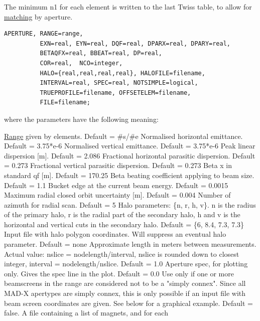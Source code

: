 The minimum n1 for each element is written to the last Twiss table, to
allow for \href{../match/match.html}{matching} by aperture.   
	
\begin{verbatim}
APERTURE, RANGE=range,
          EXN=real, EYN=real, DQF=real, DPARX=real, DPARY=real, 
          BETAQFX=real, BBEAT=real, DP=real, 
          COR=real,  NCO=integer, 
          HALO={real,real,real,real}, HALOFILE=filename,
          INTERVAL=real, SPEC=real, NOTSIMPLE=logical, 
          TRUEPROFILE=filename, OFFSETELEM=filename, 
          FILE=filename;  
\end{verbatim} 
where the parameters have the following meaning: 
\begin{madlist}
    \href{../Introduction/ranges.html}{Range} given by
     elements. Default = \#s/\#e  
    Normalised horizontal emittance. Default = 3.75*e-6  
    Normalised vertical emittance. Default = 3.75*e-6 
    Peak linear dispersion [m]. Default = 2.086 
    Fractional horizontal parasitic dispersion. Default = 0.273 
    Fractional vertical parasitic dispersion. Default = 0.273 
    Beta x in standard qf [m]. Default = 170.25 
    Beta beating coefficient applying to beam size. Default = 1.1 
    Bucket edge at the current beam energy. Default = 0.0015 
    Maximum radial closed orbit uncertainty [m]. Default = 0.004 
    Number of azimuth for radial scan. Default = 5 
    Halo parameters: \{n, r, h, v\}. n is the radius of the
     primary halo,  r is the radial part of the secondary halo, h and v
     is the horizontal and  vertical cuts in the secondary halo. Default
     = \{6, 8.4, 7.3, 7.3\}  
    Input file with halo polygon coordinates. Will
     suppress  an eventual halo parameter. Default = none  
    Approximate length in meters between
     measurements. Actual value:  nslice = nodelength/interval, nslice
     is rounded down to closest integer,  interval =
     nodelength/nslice. Default = 1.0  
    Aperture spec, for plotting only. Gives the spec line in
     the plot. Default = 0.0  
    Use only if one or more beamscreens in the range are
     considered not to  be a "simply connex". Since all MAD-X apertypes
     are simply connex, this is only possible  if an input file with
     beam screen coordinates are given. See below for a graphical
     example. Default = false.  
    A file containing a list of magnets, and for each

\end{madlist}
